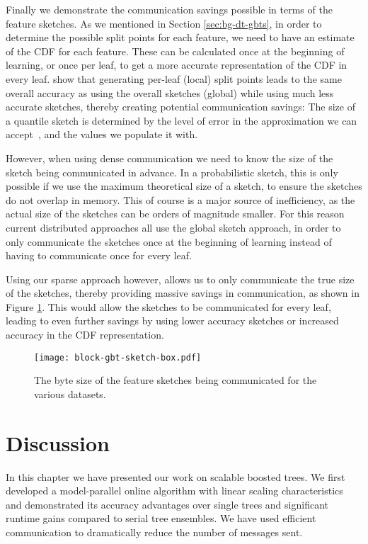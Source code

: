 Finally we demonstrate the communication savings possible in terms of the feature sketches.
As we mentioned in Section \ref{sec:bg-dt-gbts}, in order to determine the possible
split points for each feature, we need to have an estimate of the CDF for each feature. These
can be calculated once at the beginning of learning, or once per leaf, to get a more accurate representation
of the CDF in every leaf. \citet{xgboost} show that generating per-leaf (local) split points leads to the same overall
accuracy as using the overall sketches (global) while using much less accurate sketches, thereby creating potential communication savings:
The size of a quantile sketch is determined by the level of error in the approximation we can
accept~\cite{karnin2016kll}, and the values we populate it with.

However, when using dense communication we need to know the size
of the sketch being communicated in advance. In a probabilistic sketch, this is only possible
if we use the maximum theoretical size of a sketch, to ensure the sketches do not overlap in memory.
This of course is a major source of inefficiency, as the actual size of the sketches can be orders
of magnitude smaller. For this reason
current distributed approaches all use the global sketch approach, in order to only communicate
the sketches once at the beginning of learning instead of having to communicate once for every
leaf.

Using our sparse approach however, allows us to only communicate the true size of the sketches,
thereby providing massive savings in communication, as shown in Figure \ref{fig:block-gbt-sketch-size}. This would allow the sketches to be communicated for every
leaf, leading to even further savings by using lower accuracy sketches or increased accuracy
in the CDF representation.

\begin{figure}
	\centering
	\texttt{[image: block-gbt-sketch-box.pdf]}
	\vspace{-10pt}
	\caption{The byte size of the feature sketches being communicated for the various datasets.}
	\label{fig:block-gbt-sketch-size}
\end{figure}

\section{Discussion}

In this chapter we have presented our work on scalable boosted
trees. We first developed a model-parallel online algorithm with linear scaling
characteristics and demonstrated its accuracy advantages over single
trees and significant runtime gains compared to serial tree ensembles.
We have used efficient communication to dramatically reduce the number
of messages sent.


